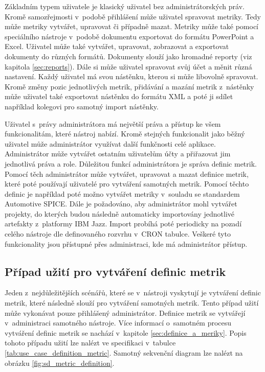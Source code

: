 \documentclass[czech,master]{diploma}
\begin{document}
Základním typem uživatele je klasický uživatel bez administrátorských práv. Kromě samozřejmosti v~podobě přihlášení může uživatel spravovat metriky. Tedy může metriky vytvářet, upravovat či případně mazat. Metriky může také pomocí speciálního nástroje v~podobě dokumentu exportovat do formátu PowerPoint a Excel. Uživatel může také vytvářet, upravovat, zobrazovat a exportovat dokumenty do různých formátů. Dokumenty slouží jako hromadné reporty (viz kapitola \ref{sec:reports}). Dále si může uživatel spravovat svůj účet a měnit různá nastavení. Každý uživatel má svou nástěnku, kterou si může libovolně spravovat. Kromě změny pozic jednotlivých metrik, přidávání a mazání metrik z~nástěnky může uživatel také exportovat nástěnku do formátu XML a poté ji sdílet například kolegovi pro samotný import nástěnky.

Uživatel s~právy administrátora má největší práva a přístup ke všem funkcionalitám, které nástroj nabízí. Kromě stejných funkcionalit jako běžný uživatel může administrátor využívat další funkčnosti celé aplikace. Administrátor může vytvářet ostatním uživatelům účty a přiřazovat jim jednotlivá práva a role. Důležitou funkcí administrátora je správa definic metrik. Pomocí těch administrátor může vytvářet, upravovat a mazat definice metrik, které poté používají uživatelé pro vytváření samotných metrik. Pomocí těchto definic je například poté možno vytvářet metriky v~souladu se standardem Automotive SPICE. Dále je požadováno, aby administrátor mohl vytvářet projekty, do kterých budou následně automaticky importovány jednotlivé artefakty z~platformy IBM Jazz. Import probíhá poté periodicky na pozadí celého nástroje dle definovaného rozvrhu v~CRON tabulce. Veškeré tyto funkcionality jsou přístupné přes 
administraci, kde má administrátor přístup.

\newpage
\subsection{Případ užití pro vytváření definic metrik}
Jeden z~nejdůležitějších scénářů, které se v~nástroji vyskytují je vytváření definic metrik, které následně slouží pro vytváření samotných metrik. Tento případ užití může vykonávat pouze přihlášený administrátor. Definice metrik se vytvářejí v~administraci samotného nástroje. Více informací o~samotném procesu vytváření definic metrik se nachází v~kapitole \ref{sec:definice_a_meriky}. Popis tohoto případu užití lze nalézt ve specifikaci v~tabulce  \ref{tab:use_case_definition_metric}. Samotný sekvenční diagram lze nalézt na obrázku \ref{fig:sd_metric_definition}.
\end{document}
